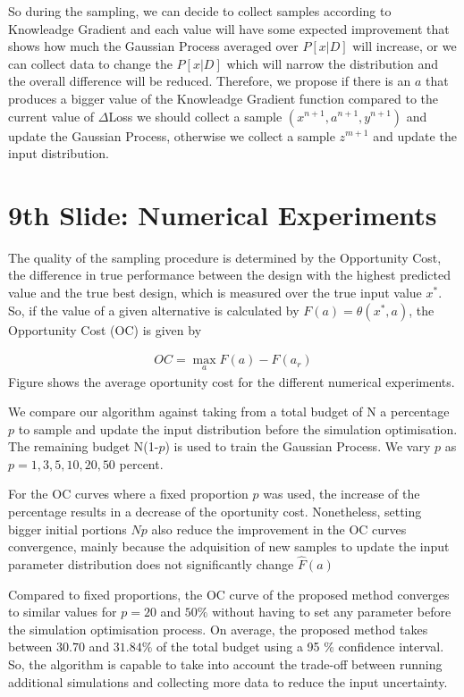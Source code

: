 \documentclass[10pt]{article}
\begin{document}
So during the sampling, we can decide to collect samples according to Knowleadge Gradient and each value will have some expected improvement that shows how much the Gaussian Process averaged over $P[x|D]$ will increase, or we can collect data to change the $P[x|D]$ which will narrow the distribution and the overall difference will be reduced. Therefore, we propose if there is an $a$ that produces a bigger value of the Knowleadge Gradient function compared to the current value of $\Delta$Loss we should collect a sample $(x^{n+1},a^{n+1},y^{n+1})$ and update the Gaussian Process, otherwise  we collect a sample $z^{m+1}$ and update the input distribution.
 
\section{9th Slide: Numerical Experiments}

The quality of the sampling procedure is determined by the Opportunity Cost, the difference in true performance between the design with the highest predicted value and the true best design, which is measured over the true input value $x^{*}$. So, if the value of a given alternative is calculated by 
$F(a) = \theta(x^{*},a)$, the Opportunity Cost (OC) is given by

\begin{align}
OC = \max_{a}F(a)-F(a_{r})
\end{align}
Figure  shows the average oportunity cost for the different numerical experiments.

We compare our algorithm against taking from a total budget of N a percentage $p$ to sample  and update the input distribution before the simulation optimisation. The remaining budget N(1-$p$) is used to train the Gaussian Process. We vary $p$ as $p = 1, 3, 5, 10, 20, 50$ percent.

For the OC curves where a fixed proportion $p$ was used, the increase of the percentage results in a decrease of the oportunity cost. Nonetheless, setting bigger initial portions $Np$ also reduce the improvement in the OC curves convergence, mainly because the adquisition of new samples to update the input parameter distribution does not significantly change $\hat{F}(a)$

Compared to fixed proportions, the OC curve of the proposed method converges to similar values for $p = 20$ and $50 \%$ without having to set any parameter before the simulation optimisation process. On average, the proposed method takes between $ 30.70$ and $31.84 \%$  of the total budget using a 95 $\%$ confidence interval. So, the algorithm is capable to take into account the trade-off between running additional simulations and collecting more data to reduce the input uncertainty.
\end{document}
